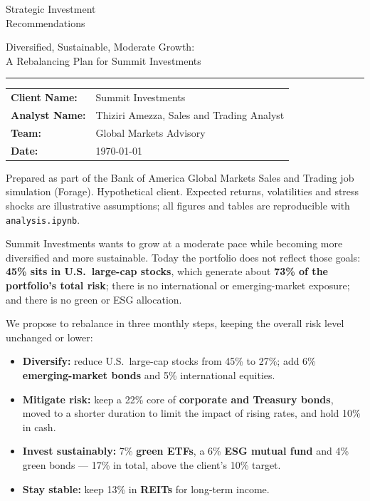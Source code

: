 \documentclass[11pt]{article}
\let\oldheading\heading
\renewcommand{\heading}[1]{\Needspace{8\baselineskip}\oldheading{#1}}
\begin{document}
\begin{titlepage}
  \vspace*{4cm}
  {\color{navy}\fontsize{30}{36}\selectfont Strategic Investment\\[2mm]
  Recommendations}\par\medskip
  {\Large Diversified, Sustainable, Moderate Growth:\\
  A Rebalancing Plan for Summit Investments}\par
  {\color{rulegray}\rule{\linewidth}{0.6pt}}\par\bigskip
  \begin{tabular}{@{}ll}
    \textbf{Client Name:}  & Summit Investments \\
    \textbf{Analyst Name:} & Thiziri Amezza, Sales and Trading Analyst \\
    \textbf{Team:}         & Global Markets Advisory \\
    \textbf{Date:}         & \today \\
  \end{tabular}
  \vfill
  {\small\color{gray}Prepared as part of the Bank of America Global Markets
  Sales and Trading job simulation (Forage). Hypothetical client. Expected
  returns, volatilities and stress shocks are illustrative assumptions; all
  figures and tables are reproducible with \texttt{analysis.ipynb}.}
\end{titlepage}

Summit Investments wants to grow at a moderate pace while becoming more
diversified and more sustainable. Today the portfolio does not reflect those
goals: \textbf{45\% sits in U.S.\ large-cap stocks}, which generate about
\textbf{73\% of the portfolio's total risk}; there is no international or
emerging-market exposure; and there is no green or ESG allocation.

We propose to rebalance in three monthly steps, keeping the overall risk level
unchanged or lower:
\begin{itemize}[leftmargin=1.5em, itemsep=2pt]
  \item \textbf{Diversify:} reduce U.S.\ large-cap stocks from 45\% to 27\%;
  add 6\% \textbf{emerging-market bonds} and 5\% international equities.
  \item \textbf{Mitigate risk:} keep a 22\% core of \textbf{corporate and
  Treasury bonds}, moved to a shorter duration to limit the impact of rising
  rates, and hold 10\% in cash.
  \item \textbf{Invest sustainably:} 7\% \textbf{green ETFs}, a 6\%
  \textbf{ESG mutual fund} and 4\% green bonds --- 17\% in total, above the
  client's 10\% target.
  \item \textbf{Stay stable:} keep 13\% in \textbf{REITs} for long-term
  income.
\end{itemize}
\end{document}
